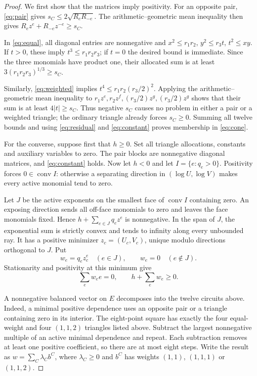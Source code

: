 \documentclass[11pt]{article}
\begin{document}
\begin{proof}
We first show that the matrices imply positivity. For an opposite
pair, \eqref{eq:pair} gives
$s_C\le2\sqrt{R_eR_{-e}}$. The arithmetic--geometric mean inequality
then gives $R_ez^e+R_{-e}z^{-e}\ge s_C$.

In \eqref{eq:equal}, all diagonal entries are nonnegative and
$x^2\le r_1r_2$, $y^2\le r_3t$, $t^2\le xy$.
If $t>0$, these imply $t^3\le r_1r_2r_3$; if $t=0$ the desired
bound is immediate. Since the three monomials have product one,
their allocated sum is at least
$3(r_1r_2r_3)^{1/3}\ge s_C$.

Similarly, \eqref{eq:weighted} implies
$t^4\le r_1r_2(r_3/2)^2$. Applying the arithmetic--geometric mean
inequality to $r_1z^e,r_2z^f,(r_3/2)z^g,(r_3/2)z^g$ shows that
their sum is at least $4|t|\ge s_C$. Thus negative $s_C$ causes no
problem in either a pair or a weighted triangle; the ordinary triangle
already forces $s_C\ge0$.
Summing all twelve bounds and using \eqref{eq:residual} and
\eqref{eq:constant} proves membership in \eqref{eq:cone}.

For the converse, suppose first that $h\ge0$. Set all triangle
allocations, constants and auxiliary variables to zero. The pair
blocks are nonnegative diagonal matrices, and \eqref{eq:constant}
holds. Now let $h<0$ and let $I=\{e:q_e>0\}$. Positivity forces
$0\in\operatorname{conv} I$: otherwise a separating direction in
$(\log U,\log V)$ makes every active monomial tend to zero.

Let $J$ be the active exponents on the smallest face of
$\operatorname{conv}I$ containing zero. An exposing direction sends
all off-face monomials to zero and leaves the face monomials fixed.
Hence $h+\sum_{e\in J}q_ez^e$ is nonnegative. In the span of $J$,
the exponential sum is strictly convex and tends to infinity along
every unbounded ray. It has a positive minimizer $z_c=(U_c,V_c)$,
unique modulo directions orthogonal to $J$. Put
\[
 w_e=q_ez_c^e\quad(e\in J),\qquad w_e=0\quad(e\notin J).
\]
Stationarity and positivity at this minimum give
\begin{equation}\label{eq:balance}
               \sum_e w_e e=0,\qquad h+\sum_e w_e\ge0.
\end{equation}

A nonnegative balanced vector on $E$ decomposes into the twelve
circuits above. Indeed, a minimal positive dependence uses an opposite
pair or a triangle containing zero in its interior. The eight-point
square has exactly the four equal-weight and four $(1,1,2)$ triangles
listed above. Subtract the largest nonnegative multiple of an active
minimal dependence and repeat. Each subtraction removes at least one
positive coefficient, so there are at most eight steps. Write the
result as $w=\sum_C\lambda_C b^C$, where $\lambda_C\ge0$ and $b^C$
has weights $(1,1)$, $(1,1,1)$ or $(1,1,2)$.


\end{proof}
\end{document}
